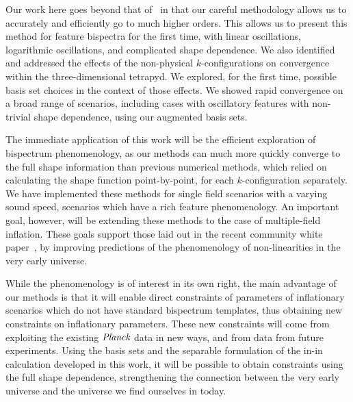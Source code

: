 Our work here goes beyond that of~\cite{Funakoshi} in that our careful methodology
allows us to accurately and efficiently go to much higher orders.
This allows us to present this method for feature bispectra for the first time,
with linear oscillations, logarithmic oscillations, and complicated shape dependence.
We also identified and addressed the effects
of the non-physical $k$-configurations on convergence within the three-dimensional tetrapyd.
We explored, for the first time, possible basis set choices in the context of those effects.
We showed rapid convergence on a broad range of scenarios,
including cases with oscillatory features with non-trivial shape dependence,
using our augmented basis sets.


The immediate application of this work will be the efficient exploration of
bispectrum phenomenology, as our methods can much more quickly
converge to the full shape information than previous numerical methods,
which relied on calculating the shape function point-by-point, for each $k$-configuration separately.
We have implemented these methods for single field scenarios
with a varying sound speed, scenarios which
have a rich feature phenomenology. An important goal, however, will be extending
these methods to the case of multiple-field inflation.
These goals support those laid out in the recent community white paper~\cite{astro2020_png},
by improving predictions of the phenomenology of non-linearities in the very early universe.

While the phenomenology is of interest in its own right,
the main advantage of our methods is that it will enable
direct constraints of parameters of inflationary scenarios which do not have
standard bispectrum templates, thus obtaining new constraints on inflationary parameters.
These new constraints will come from exploiting the existing $\textit{Planck}$ data in
new ways, and from data from future experiments.
Using the basis sets and the separable formulation of the in-in calculation developed in this work,
it will be possible to obtain constraints using the full shape dependence,
strengthening the connection between the very early universe and the universe we
find ourselves in today.

